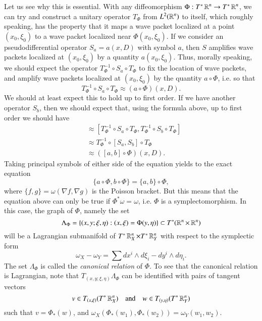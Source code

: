 Let us see why this is essential. With any diffeomorphism $\Phi: T^* \operatorname{\mathbb{R}}^n \to T^* \operatorname{\mathbb{R}}^n$, we can try and construct a unitary operator $T_\Phi$ from $L^2(\operatorname{\mathbb{R}}^n)$ to itself, which roughly speaking, has the property that it maps a wave packet localized at a point $(x_0,\xi_0)$ to a wave packet localized near $\Phi(x_0,\xi_0)$. If we consider an pseudodifferential operator $S_a = a(x,D)$ with symbol $a$, then $S$ amplifies wave packets localized at $(x_0,\xi_0)$ by a quantity $a(x_0,\xi_0)$. Thus, morally speaking, we should expect the operator $T_\Phi^{-1} \circ S_a \circ T_\Phi$ to fix the location of wave packets, and amplify wave packets localized at $(x_0,\xi_0)$ by the quantity $a \circ \Phi$, i.e. so that
%
\[ T_\Phi^{-1} \circ S_a \circ T_\Phi \approx (a \circ \Phi)(x,D). \]
%
We should at least expect this to hold up to first order. If we have another operator $S_b$, then we should expect that, using the formula above, up to first order we should have
%
\begin{align*}
    [(a \circ \Phi)(x,D), (b \circ \Phi)(x,D)] &\approx [T_\Phi^{-1} \circ S_a \circ T_\Phi, T_\Phi^{-1} \circ S_b \circ T_\Phi]\\
    &\approx T_\Phi^{-1} \circ [S_a,S_b] \circ T_\Phi\\
    &\approx ([a,b] \circ \Phi)(x,D).
\end{align*}
%
Taking principal symbols of either side of the equation yields to the exact equation
%
\[ \{ a \circ \Phi, b \circ \Phi \} = \{ a, b \} \circ \Phi, \]
%
where $\{ f,g \} = \omega( \nabla f, \nabla g )$ is the Poisson bracket. But this means that the equation above can only be true if $\Phi^* \omega = \omega$, i.e. $\Phi$ is a symplectomorphism. In this case, the graph of $\Phi$, namely the set
%
\[ \Lambda_\Phi = \{ (x,y;\xi,\eta) : (x,\xi) = \Phi(y,\eta) \} \subset T^*(\operatorname{\mathbb{R}}^n \times \operatorname{\mathbb{R}}^n) \]
%
will be a Lagrangian submanifold of $T^* \operatorname{\mathbb{R}}^n_X \times T^* \operatorname{\mathbb{R}}^n_Y$ with respect to the symplectic form
%
\[ \omega_X - \omega_Y = \sum dx^i \wedge d\xi_i - dy^i \wedge d\eta_i. \]
%
The set $\Lambda_\Phi$ is called the \emph{canonical relation} of $\Phi$. To see that the canonical relation is Lagrangian, note that $T_{(x,y;\xi,\eta)} \Lambda_\Phi$ can be identified with pairs of tangent vectors
%
\[ v \in T_{(x,\xi)} (T^* \operatorname{\mathbb{R}}^n_X) \quad\text{and}\quad w \in T_{(y,\eta)} (T^* \operatorname{\mathbb{R}}^n_Y) \]
%
such that $v = \Phi_*(w)$, and $\omega_X(\Phi_*(w_1),\Phi_*(w_2)) = \omega_Y(w_1,w_2)$.
%

